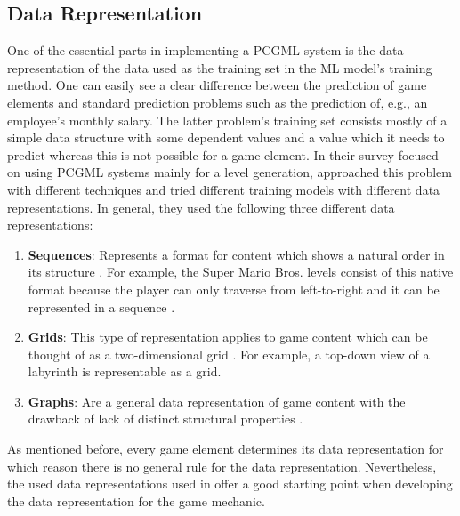 \documentclass[MGS,Master,english]{twbook}%
\begin{document}
\subsection{Data Representation}
One of the essential parts in implementing a PCGML system is the data representation of the data used as the training set in the ML model's training method. One can easily see a clear difference between the prediction of game elements and standard prediction problems such as the prediction of, e.g., an employee's monthly salary. The latter problem’s training set consists mostly of a simple data structure with some dependent values and a value which it needs to predict whereas this is not possible for a game element. In their survey focused on using PCGML systems mainly for a level generation, \cite{pcgml::paper} approached this problem with different techniques and tried different training models with different data representations. In general, they used the following three different data representations:
\begin{enumerate}
	\item \textbf{Sequences}: Represents a format for content which shows a natural order in its structure \cite{pcgml::paper}. For example, the Super Mario Bros. levels consist of this native format because the player can only traverse from left-to-right and it can be represented in a sequence \cite{pcgml::paper}. 
	\item \textbf{Grids}: This type of representation applies to game content which can be thought of as a two-dimensional grid \cite{pcgml::paper}. For example, a top-down view of a labyrinth is representable as a grid.
	\item \textbf{Graphs}: Are a general data representation of game content with the drawback of lack of distinct structural properties \cite{pcgml::paper}. 
\end{enumerate}
As mentioned before, every game element determines its data representation for which reason there is no general rule for the data representation. Nevertheless, the used data representations used in \cite{pcgml::paper} offer a good starting point when developing the data representation for the game mechanic.
\end{document}
